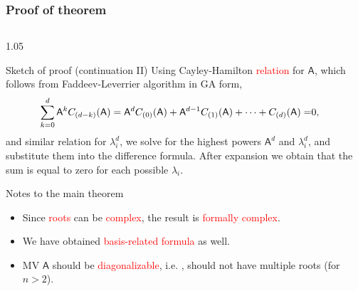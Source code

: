 \documentclass[xcolor=table,hyperref={pdfpagemode=FullScreen}]{beamer}
\def\m#1{\mathsf{#1}} %
\def\m#1{\mathsf{#1}}%
\newcommand{\red}[1]{\textcolor{red}{#1}}
\begin{document}
\begin{frame}
\label{proofLastSlide}
\frametitle<presentation>{Proof of theorem}
\vskip -19pt
\begin{columns}[t]
\begin{column}{1.05\textwidth}
  \begin{block}{Sketch of proof (continuation II)}
 Using Cayley-Hamilton \red{relation} for $\m{A}$, which follows from Faddeev-Leverrier algorithm in GA form,
\abovedisplayskip=5pt
\belowdisplayskip=5pt
\begin{align*}
  \sum_{k=0}^{d}  \m{A}^k C_{(d-k)}(\m{A})=\m{A}^{d}C_{(0)}(\m{A})+\m{A}^{d-1}C_{(1)}(\m{A})+\cdots + C_{(d)}(\m{A})= &0\notag,
\end{align*}
and  similar relation for $\lambda_i^d$, we solve for the highest
powers $\m{A}^{d}$ and $\lambda_i^d$, and  substitute them
into the difference formula. After expansion we
    obtain that the sum is equal to  zero for each possible $\lambda_i$.
\end{block}   
\begin{block}{Notes to the main theorem}
\begin{itemize}
\item Since \red{roots} can be \red{complex}, the result is \red{formally complex}.
\item We have obtained \red{basis-related formula} as well.
\item MV $\m{A}$ should be \red{diagonalizable}, i.e. 
  \hyperlink{MinimalPolynomial}{}, should not have multiple roots (for $ n> 2$).
\end{itemize}
\end{block}
\end{column}
\end{columns}
\end{frame}
\end{document}
